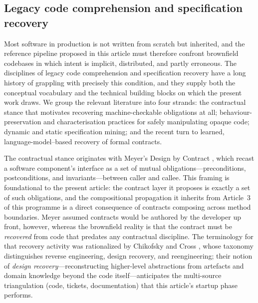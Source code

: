 \subsection{Legacy code comprehension and specification recovery}
\label{subsec:rw8}

Most software in production is not written from scratch but inherited, and the reference pipeline proposed in this article must therefore confront brownfield codebases in which intent is implicit, distributed, and partly erroneous. The disciplines of legacy code comprehension and specification recovery have a long history of grappling with precisely this condition, and they supply both the conceptual vocabulary and the technical building blocks on which the present work draws. We group the relevant literature into four strands: the contractual stance that motivates recovering machine-checkable obligations at all; behaviour-preservation and characterisation practices for safely manipulating opaque code; dynamic and static specification mining; and the recent turn to learned, language-model--based recovery of formal contracts.

The contractual stance originates with Meyer's Design by Contract \cite{meyer1992dbc}, which recast a software component's interface as a set of mutual obligations---preconditions, postconditions, and invariants---between caller and callee. This framing is foundational to the present article: the contract layer it proposes is exactly a set of such obligations, and the compositional propagation it inherits from Article~3 of this programme \cite{edmonds_article3} is a direct consequence of contracts composing across method boundaries. Meyer assumed contracts would be authored by the developer up front, however, whereas the brownfield reality is that the contract must be \emph{recovered} from code that predates any contractual discipline. The terminology for that recovery activity was rationalized by Chikofsky and Cross \cite{chikofsky1990reverse}, whose taxonomy distinguishes reverse engineering, design recovery, and reengineering; their notion of \emph{design recovery}---reconstructing higher-level abstractions from artefacts and domain knowledge beyond the code itself---anticipates the multi-source triangulation (code, tickets, documentation) that this article's startup phase performs.

